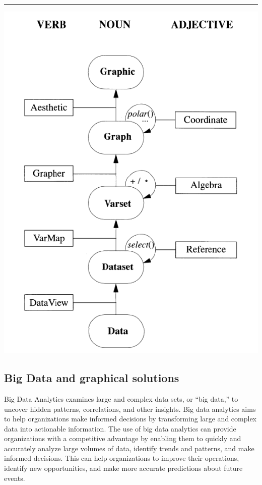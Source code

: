 \documentclass[print]{nuthesis}
\begin{document}
\begin{center}\rule{0.5\linewidth}{0.5pt}\end{center}

\begin{center}
\includegraphics[width=\textwidth]{figure/graphic-flowchart}
\end{center}

\hypertarget{big-data-and-graphical-solutions}{%
\subsection{Big Data and graphical solutions}\label{big-data-and-graphical-solutions}}

Big Data Analytics examines large and complex data sets, or ``big data,'' to uncover hidden patterns, correlations, and other insights. Big data analytics aims to help organizations make informed decisions by transforming large and complex data into actionable information. The use of big data analytics can provide organizations with a competitive advantage by enabling them to quickly and accurately analyze large volumes of data, identify trends and patterns, and make informed decisions. This can help organizations to improve their operations, identify new opportunities, and make more accurate predictions about future events.
\end{document}
